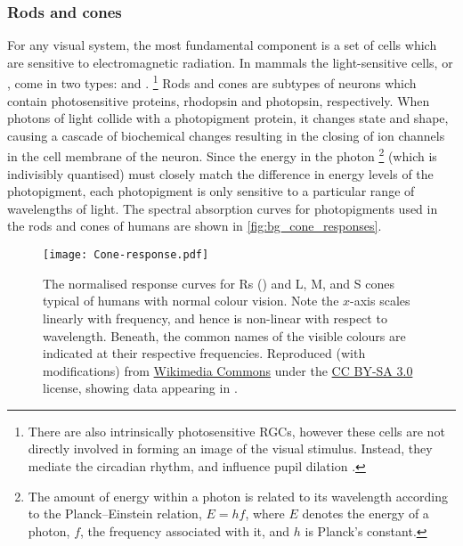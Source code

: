 \subsubsection{Rods and cones}

For any visual system, the most fundamental component is a set of cells which are sensitive to electromagnetic radiation.
In mammals the light-sensitive cells, or , come in two types:  and  \citep[Chapter~11]{nsbook}.%
\footnote{
There are also intrinsically photosensitive \aclp{RGC}, however these cells are not directly involved in forming an image of the visual stimulus.
Instead, they mediate the circadian rhythm, and influence pupil dilation \citep{Berson2002,Ecker2010,Wong2005}.
}
Rods and cones are subtypes of neurons which contain photosensitive proteins, rhodopsin and photopsin, respectively.
When photons of light collide with a photopigment protein, it changes state and shape, causing a cascade of biochemical changes resulting in the closing of ion channels in the cell membrane of the neuron.
Since the energy in the photon%
\footnote{
The amount of energy within a photon is related to its wavelength according to the Planck--Einstein relation,
$E = h f$, where $E$ denotes the energy of a photon, $f$, the frequency associated with it, and $h$ is Planck's constant.%
}
(which is indivisibly quantised) must closely match the difference in energy levels of the photopigment, each photopigment is only sensitive to a particular range of wavelengths of light.
The spectral absorption curves for photopigments used in the rods and cones of humans are shown in \autoref{fig:bg_cone_responses}.

\begin{figure}[htbp]
\centering
\texttt{[image: Cone-response.pdf]}
\caption{
The normalised response curves for \aclp{R} () and \acf{L}, \acf{M}, and \acf{S} cones typical of humans with normal colour vision.
Note the $x$-axis scales linearly with frequency, and hence is non-linear with respect to wavelength.
Beneath, the common names of the visible colours are indicated at their respective frequencies.
Reproduced (with modifications) from \href{https://commons.wikimedia.org/wiki/File:Cone-response.svg}{Wikimedia Commons} under the \href{https://creativecommons.org/licenses/by-sa/3.0/deed.en}{CC BY-SA 3.0} license, showing data appearing in \citet{Bowmaker1980}.
}
\label{fig:bg_cone_responses}
\end{figure}

